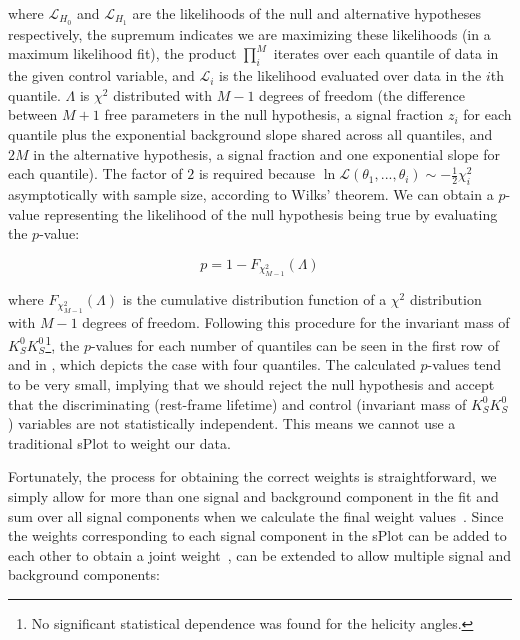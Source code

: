 where $\mathcal{L}_{H_0}$ and $\mathcal{L}_{H_1}$ are the likelihoods of the null and alternative hypotheses respectively, the supremum indicates we are maximizing these likelihoods (in a maximum likelihood fit), the product $\prod_i^M$ iterates over each quantile of data in the given control variable, and $\mathcal{L}_i$ is the likelihood evaluated over data in the $i$th quantile. $\Lambda$ is $\chi^2$ distributed with $M - 1$ degrees of freedom (the difference between $M + 1$ free parameters in the null hypothesis, a signal fraction $z_i$ for each quantile plus the exponential background slope shared across all quantiles, and $2M$ in the alternative hypothesis, a signal fraction and one exponential slope for each quantile). The factor of $2$ is required because $\ln\mathcal{L}(\theta_1,...,\theta_i) \sim -\frac{1}{2}\chi^2_i$ asymptotically with sample size, according to Wilks' theorem. We can obtain a $p$-value representing the likelihood of the null hypothesis being true by evaluating the $p$-value:

\begin{equation}
  p = 1 - F_{\chi^2_{M-1}}(\Lambda)
  \label{eq:significance-test}
\end{equation}

where $F_{\chi^2_{M-1}}(\Lambda)$ is the cumulative distribution function of a $\chi^2$ distribution with $M-1$ degrees of freedom. Following this procedure for the invariant mass of $K_S^0K_S^0$\footnote{No significant statistical dependence was found for the helicity angles.}, the $p$-values for each number of quantiles can be seen in the first row of  and in , which depicts the case with four quantiles. The calculated $p$-values tend to be very small, implying that we should reject the null hypothesis and accept that the discriminating (rest-frame lifetime) and control (invariant mass of $K_S^0K_S^0$) variables are not statistically independent. This means we cannot use a traditional sPlot to weight our data.

Fortunately, the process for obtaining the correct weights is straightforward, we simply allow for more than one signal and background component in the fit and sum over all signal components when we calculate the final weight values~\cite{dembinski_custom_2022}. Since the weights corresponding to each signal component in the sPlot can be added to each other to obtain a joint weight~\cite{pivk_splot_2005},  can be extended to allow multiple signal and background components:

